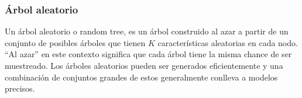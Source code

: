 \subsubsection{Árbol aleatorio}

	Un árbol aleatorio o random tree, es un árbol construido al azar a partir de un conjunto de posibles árboles que tienen $K$ características aleatorias en cada nodo. ``Al azar'' en este contexto significa que cada árbol tiene la misma chance de ser muestreado. Los árboles aleatorios pueden ser generados eficientemente y una combinación de conjuntos grandes de estos generalmente conlleva a modelos precisos.